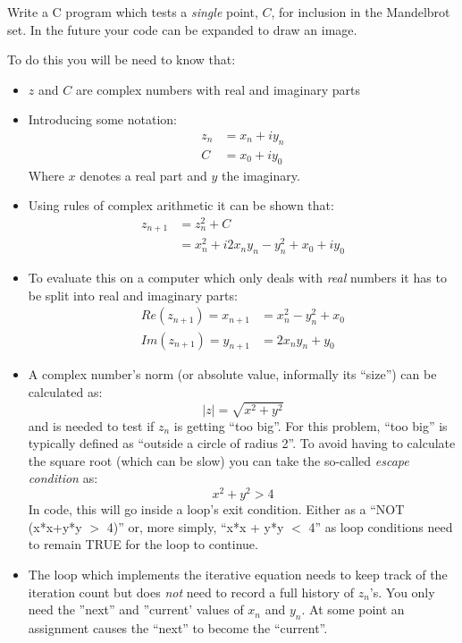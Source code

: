 \documentclass{lab}
\begin{document}
\begin{task}{}{} Write a C program which tests a \textit{single} point, $C$, for inclusion in the Mandelbrot set. In the future your code can be expanded to draw an image.
\end{task}

To do this you will be need to know that:
\begin{itemize}[itemsep=0mm]
\item $z$ and $C$ are complex numbers with real and imaginary parts

\item Introducing some notation:
\begin{align}
z_n &= x_n + iy_n \\
C &= x_0 + iy_0
\end{align}
Where $x$ denotes a real part and $y$ the imaginary.
\item Using rules of complex arithmetic it can be shown that:
\begin{align}
z_{n+1} &= z^2_{n} + C \\
&= x^2_n + i2x_ny_n - y^2_n + x_0 + iy_0
\end{align}
\item To evaluate this on a computer which only deals with \textit{real} numbers it has to be split into real and imaginary parts:
\begin{align}
Re(z_{n+1}) = x_{n+1} &= x^2_n - y^2_n + x_0\\
Im(z_{n+1}) = y_{n+1} &= 2x_ny_n + y_0
\end{align}
\item A complex number's norm (or absolute value, informally its ``size'') can be calculated as:
\begin{equation}
\left|z\right| = \sqrt{x^2 + y^2}
\end{equation}
and is needed to test if $z_n$ is getting ``too big''. For this problem, ``too big'' is typically defined as ``outside a circle of radius 2''. To avoid having to calculate the square root (which can be slow) you can take the so-called \textit{escape condition} as:
\begin{equation}
x^2 + y^2 > 4
\end{equation}
In code, this will go inside a loop's exit condition. Either as a ``NOT (x*x+y*y $>$ 4)'' or, more simply, ``x*x + y*y $<$ 4'' as loop conditions need to remain TRUE for the loop to continue.
\item The loop which implements the iterative equation needs to keep track of the iteration count but does \textit{not} need to record a full history of $z_n$'s. You only need the ''next'' and ''current' values of $x_n$ and $y_n$. At some point an assignment causes the ``next'' to become the ``current''.

\end{itemize}
\end{document}
